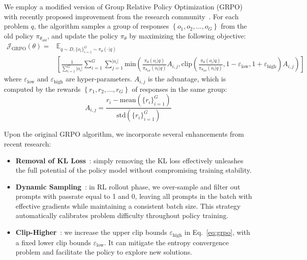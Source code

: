 \documentclass[11pt, a4paper, logo, copyright, nonumbering]{xiaomi}
\begin{document}
We employ a modified version of Group Relative Policy Optimization (GRPO)~\citep{shao2024deepseekmath} with recently proposed improvement from the research community~\citep{hu2025open,yu2025dapo}.
For each problem $q$, the algorithm samples a group of responses $\left\{o_1,o_2,...,o_G\right\}$ from the old policy $\pi_{\theta_{old}}$, and update the policy $\pi_\theta$ by maximizing the following objective:
\begin{equation}
\begin{aligned}
\label{eq:grpo}
    \mathcal{J}_{\mathrm{GRPO}}\left(\theta\right)=& \mathbb{E}_{q\sim D,\{o_i\}_{i=1}^G\sim \pi_\theta(\cdot|q)} \\
    & \left[\frac{1}{\sum_{i=1}^G\left|o_i\right|}\sum_{i=1}^G \sum_{j=1}^{\left|o_i\right|} \mathrm{min}\left(\frac{\pi_\theta(o_i|q)}{\pi_{\theta_{old}}(o_i|q)}A_{i,j},\mathrm{clip}\left(\frac{\pi_\theta(o_i|q)}{\pi_{\theta_{old}}(o_i|q)},1-\varepsilon_\mathrm{low},1+\varepsilon_\mathrm{high}\right)A_{i,j}\right)\right]
\end{aligned}
\end{equation}
where $\varepsilon_{\mathrm{low}}$ and $\varepsilon_{\mathrm{high}}$ are hyper-parameters. $A_{i,j}$ is the advantage, which is computed by the rewards $\left\{r_1,r_2,...,r_G\right\}$ of responses in the same group:
\begin{equation}
    A_{i,j} = \frac{r_i-\mathrm{mean}(\{r_i\}_{i=1}^G)}{\mathrm{std}(\{r_i\}_{i=1}^G)}
\end{equation}


Upon the original GRPO algorithm, we incorporate several enhancements from recent research:
\begin{itemize}
    \item \textbf{Removal of KL Loss}~\citep{hu2025open,skywork-or1-2025}: simply removing the KL loss effectively unleashes the full potential of the policy model without compromising training stability.
    \item \textbf{Dynamic Sampling}~\citep{yu2025dapo}: in RL rollout phase, we over-sample and filter out prompts with passrate equal to 1 and 0, leaving all prompts in the batch with effective gradients while maintaining a consistent batch size. This strategy automatically calibrates problem difficulty throughout policy training.
    \item \textbf{Clip-Higher}~\citep{yu2025dapo}: we increase the upper clip bounds $\varepsilon_{\mathrm{high}}$ in Eq.~\ref{eq:grpo}, with a fixed lower clip bounds $\varepsilon_{\mathrm{low}}$. It can mitigate the entropy convergence problem and facilitate the policy to explore new solutions.
\end{itemize}
\end{document}
